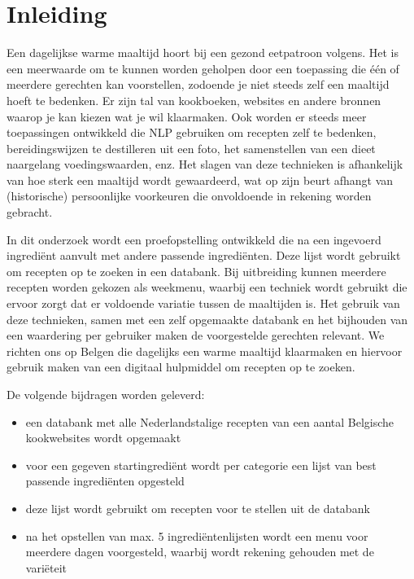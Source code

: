 \documentclass{hogent-article}
\begin{document}



\section{Inleiding}%
\label{sec:inleiding}


Een dagelijkse warme maaltijd hoort bij een gezond eetpatroon volgens\cite{Galle2016}. Het is een meerwaarde om te kunnen worden geholpen door een toepassing die één of meerdere gerechten kan voorstellen, zodoende je niet steeds zelf een maaltijd hoeft te bedenken. Er zijn tal van kookboeken, websites en andere bronnen waarop je kan kiezen wat je wil klaarmaken. Ook worden er steeds meer toepassingen ontwikkeld die NLP gebruiken om recepten zelf te bedenken, bereidingswijzen te destilleren uit een foto, het samenstellen van een dieet naargelang voedingswaarden, enz. Het slagen van deze technieken is afhankelijk van hoe sterk een maaltijd wordt gewaardeerd, wat op zijn beurt afhangt van (historische) persoonlijke voorkeuren die onvoldoende in rekening worden gebracht.

In dit onderzoek wordt een proefopstelling ontwikkeld die na een ingevoerd ingrediënt aanvult met andere passende ingrediënten. Deze lijst wordt gebruikt om recepten op te zoeken in een databank. Bij uitbreiding kunnen meerdere recepten worden gekozen als weekmenu, waarbij een techniek wordt gebruikt die ervoor zorgt dat er voldoende variatie tussen de maaltijden is. Het gebruik van deze technieken, samen met een zelf opgemaakte databank en het bijhouden van een waardering per gebruiker maken de voorgestelde gerechten relevant. We richten ons op Belgen die dagelijks een warme maaltijd klaarmaken en hiervoor gebruik maken van een digitaal hulpmiddel om recepten op te zoeken. 

De volgende bijdragen worden geleverd:
\begin{itemize}
    \item een databank met alle Nederlandstalige recepten van een aantal Belgische kookwebsites wordt opgemaakt
    \item voor een gegeven startingrediënt wordt per categorie een lijst van best passende ingrediënten opgesteld
    \item deze lijst wordt gebruikt om recepten voor te stellen uit de databank
    \item na het opstellen van max. 5 ingrediëntenlijsten wordt een menu voor meerdere dagen voorgesteld, waarbij wordt rekening gehouden met de variëteit
\end{itemize}
\end{document}
